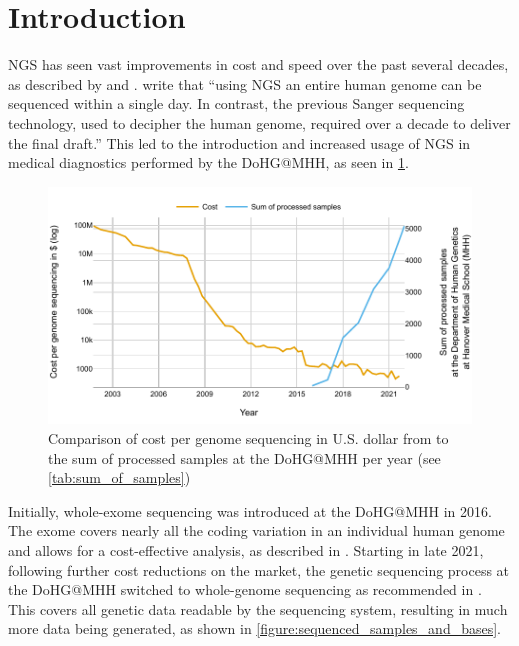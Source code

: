\section{Introduction}\label{sec:introduction}

\Ac{NGS} has seen vast improvements in cost and speed over the past several decades, as described by \citeauthor{Schloss2008} \autocite{Schloss2008} and \citeauthor{Davey2011} \autocite{Davey2011}. \citeauthor{Behjati2013} \autocite{Behjati2013} write that \enquote{using \acs{NGS} an entire human genome can be sequenced within a single day. In contrast, the previous Sanger sequencing technology, used to decipher the human genome, required over a decade to deliver the final draft.} 
This led to the introduction and increased usage of \ac{NGS} in medical diagnostics performed by the \acf{DoHG@MHH}, as seen in \cref{figure:sequenced_samples_and_cost}.

\begin{figure}[H]
    \centering
	\includegraphics[width=\linewidth,height=\textheight,keepaspectratio]{sequenced_samples_and_cost}
	\caption[Comparison of cost per genome sequencing to the sum of processed samples at the \acs{DoHG@MHH}]{Comparison of cost per genome sequencing in U.S. dollar from \autocite{Wetterstrand2021} to the sum of processed samples at the \acl{DoHG@MHH} per year (see \cref{tab:sum_of_samples})}
	\label{figure:sequenced_samples_and_cost}
\end{figure}

Initially, whole-exome sequencing was introduced at the \ac{DoHG@MHH} in 2016. The exome covers nearly all the coding variation in an individual human genome and allows for a cost-effective analysis, as described in \autocite{Bamshad2011}. Starting in late 2021, following further cost reductions on the market, the genetic sequencing process at the \ac{DoHG@MHH} switched to whole-genome sequencing as recommended in \autocite{VanEl2013}. This covers all genetic data readable by the sequencing system, resulting in much more data being generated, as shown in \cref{figure:sequenced_samples_and_bases}.

